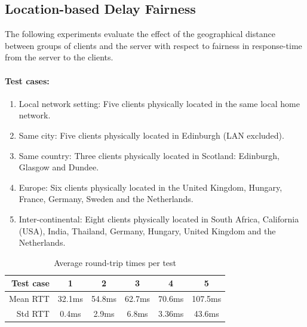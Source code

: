 \documentclass[bsc, 12pt, twoside, singlespacing, parskip, abbrevs, notimes, normalheadings, logo]{styles/infthesis}
\begin{document}
\subsection{Location-based Delay Fairness}
The following experiments evaluate the effect of the geographical distance between groups of clients and the server with respect to fairness in response-time from the server to the clients.

\paragraph*{Test cases:}
\begin{enumerate}
\item Local network setting: Five clients physically located in the same local home network.

\item Same city: Five clients physically located in Edinburgh (LAN excluded).

\item Same country: Three clients physically located in Scotland: Edinburgh, Glasgow and Dundee.

\item Europe: Six clients physically located in the United Kingdom, Hungary, France, Germany, Sweden and the Netherlands.

\item Inter-continental: Eight clients physically located in South Africa, California (USA), India, Thailand, Germany, Hungary, United Kingdom and the Netherlands.
\end{enumerate}

\begin{table}[H]
\centering
  \begin{tabular}{ | r || c | c | c | c | c |}
    \hline
    Test case 		& 1 		& 2 		& 3 		& 4 		& 5 		\\ \hline\hline
    Mean RTT 		& 32.1ms 	& 54.8ms 	& 62.7ms 	& 70.6ms 	& 107.5ms	\\ \hline
    Std RTT			& 0.4ms		& 2.9ms		& 6.8ms		& 3.36ms	& 43.6ms	\\ \hline
  \end{tabular}
  \caption{Average round-trip times per test}
  \label{table:geo_avg_roundtrip}
\end{table}
\end{document}
